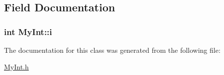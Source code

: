 \subsection{Field Documentation}
\subsubsection[{\texorpdfstring{i}{i}}]{\setlength{\rightskip}{0pt plus 5cm}int My\+Int\+::i}\hypertarget{classMyInt_a41aa98ac1f20fd838d0ba2bb4d9ab6a2}{}\label{classMyInt_a41aa98ac1f20fd838d0ba2bb4d9ab6a2}


The documentation for this class was generated from the following file\+:\begin{DoxyCompactItemize}
\item 
\hyperlink{MyInt_8h}{My\+Int.\+h}\end{DoxyCompactItemize}

